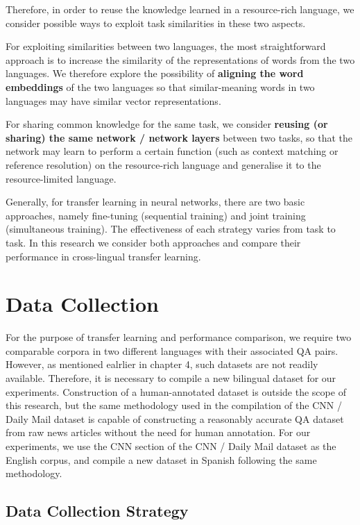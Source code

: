 \documentclass[]{article}
\begin{document}
Therefore, in order to reuse the knowledge learned in a resource-rich language, we consider possible ways to exploit task similarities in these two aspects.

For exploiting similarities between two languages, the most straightforward approach is to increase the similarity of the representations of words from the two languages. We therefore explore the possibility of \textbf{aligning the word embeddings} of the two languages so that similar-meaning words in two languages may have similar vector representations.

For sharing common knowledge for the same task, we consider \textbf{reusing (or sharing) the same network / network layers} between two tasks, so that the network may learn to perform a certain function (such as context matching or reference resolution) on the resource-rich language and generalise it to the resource-limited language. 

Generally, for transfer learning in neural networks, there are two basic approaches, namely fine-tuning (sequential training) and joint training (simultaneous training). The effectiveness of each strategy varies from task to task. In this research we consider both approaches and compare their performance in cross-lingual transfer learning.


\section{Data Collection}

For the purpose of transfer learning and performance comparison, we require two comparable corpora in two different languages with their associated QA pairs. However, as mentioned ealrlier in chapter 4, such datasets are not readily available. Therefore, it is necessary to compile a new bilingual dataset for our experiments. Construction of a human-annotated dataset is outside the scope of this research, but the same methodology used in the compilation of the CNN / Daily Mail dataset \cite{hermann2015teaching} is capable of constructing a reasonably accurate QA dataset from raw news articles without the need for human annotation. For our experiments, we use the CNN section of the CNN / Daily Mail dataset as the English corpus, and compile a new dataset in Spanish following the same methodology.

\subsection{Data Collection Strategy}
\end{document}
